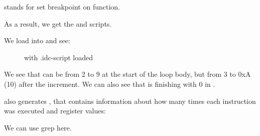  stands for set breakpoint on function.

As a result, we get the  and  scripts.

\clearpage
We load  into \IDA and see:

\begin{figure}[H]
\centering
{}
\caption{\IDA with .idc-script loaded}
\label{fig:loops_IDA_tracer}
\end{figure}

We see that \ESI can be from 2 to 9 at the start of the loop body,
but from 3 to 0xA (10) after the increment.
We can also see that \main is finishing with 0 in \EAX.

\tracer also generates , 
that contains information about how many times each instruction was executed and
register values:


\myindex{\GrepUsage}
We can use grep here.

